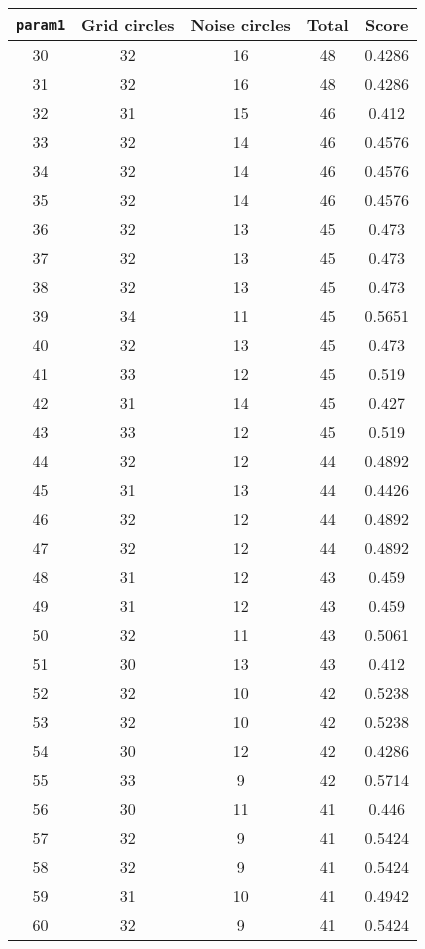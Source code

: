 \documentclass[letterpaper, 12pt]{article}
\begin{document}
\begin{longtable}{|c|c|c|c|c|}
\hline
\textbf{\texttt{param1}} & \textbf{Grid circles} & \textbf{Noise circles} & \textbf{Total} & \textbf{Score} \\
\hline
30 & 32 & 16 & 48 & 0.4286 \\
\hline
31 & 32 & 16 & 48 & 0.4286 \\
\hline
32 & 31 & 15 & 46 & 0.412 \\
\hline
33 & 32 & 14 & 46 & 0.4576 \\
\hline
34 & 32 & 14 & 46 & 0.4576 \\
\hline
35 & 32 & 14 & 46 & 0.4576 \\
\hline
36 & 32 & 13 & 45 & 0.473 \\
\hline
37 & 32 & 13 & 45 & 0.473 \\
\hline
38 & 32 & 13 & 45 & 0.473 \\
\hline
39 & 34 & 11 & 45 & 0.5651 \\
\hline
40 & 32 & 13 & 45 & 0.473 \\
\hline
41 & 33 & 12 & 45 & 0.519 \\
\hline
42 & 31 & 14 & 45 & 0.427 \\
\hline
43 & 33 & 12 & 45 & 0.519 \\
\hline
44 & 32 & 12 & 44 & 0.4892 \\
\hline
45 & 31 & 13 & 44 & 0.4426 \\
\hline
46 & 32 & 12 & 44 & 0.4892 \\
\hline
47 & 32 & 12 & 44 & 0.4892 \\
\hline
48 & 31 & 12 & 43 & 0.459 \\
\hline
49 & 31 & 12 & 43 & 0.459 \\
\hline
50 & 32 & 11 & 43 & 0.5061 \\
\hline
51 & 30 & 13 & 43 & 0.412 \\
\hline
52 & 32 & 10 & 42 & 0.5238 \\
\hline
53 & 32 & 10 & 42 & 0.5238 \\
\hline
54 & 30 & 12 & 42 & 0.4286 \\
\hline
55 & 33 & 9 & 42 & 0.5714 \\
\hline
56 & 30 & 11 & 41 & 0.446 \\
\hline
57 & 32 & 9 & 41 & 0.5424 \\
\hline
58 & 32 & 9 & 41 & 0.5424 \\
\hline
59 & 31 & 10 & 41 & 0.4942 \\
\hline
60 & 32 & 9 & 41 & 0.5424 \\

\end{longtable}
\end{document}
